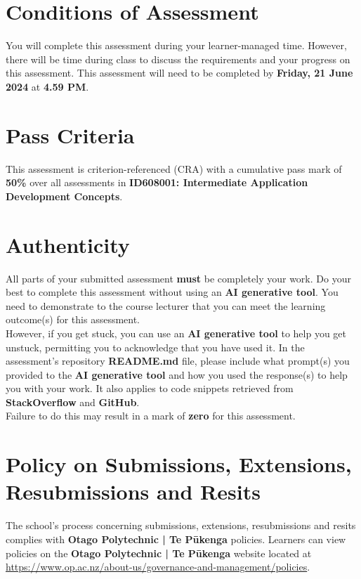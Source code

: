 \documentclass{article}
\begin{document}
\section*{Conditions of Assessment}
You will complete this assessment during your learner-managed time. However, there will be time during class to discuss the requirements and your progress on this assessment. This assessment will need to be completed by \textbf{Friday, 21 June 2024} at \textbf{4.59 PM}. 

\section*{Pass Criteria}
This assessment is criterion-referenced (CRA) with a cumulative pass mark of \textbf{50\%} over all assessments in \textbf{ID608001: Intermediate Application Development Concepts}.

\section*{Authenticity}
All parts of your submitted assessment \textbf{must} be completely your work. Do your best to complete this assessment without using an \textbf{AI generative tool}. You need to demonstrate to the course lecturer that you can meet the learning outcome(s) for this assessment. \\
 
 However, if you get stuck, you can use an \textbf{AI generative tool} to help you get unstuck, permitting you to acknowledge that you have used it. In the assessment's repository \textbf{README.md} file, please include what prompt(s) you provided to the \textbf{AI generative tool} and how you used the response(s) to help you with your work. It also applies to code snippets retrieved from \textbf{StackOverflow} and \textbf{GitHub}. \\
 
 Failure to do this may result in a mark of \textbf{zero} for this assessment.

\section*{Policy on Submissions, Extensions, Resubmissions and Resits}
The school's process concerning submissions, extensions, resubmissions and resits complies with \textbf{Otago Polytechnic | Te Pūkenga} policies. Learners can view policies on the \textbf{Otago Polytechnic | Te Pūkenga} website located at \href{https://www.op.ac.nz/about-us/governance-and-management/policies}{https://www.op.ac.nz/about-us/governance-and-management/policies}.
\end{document}
